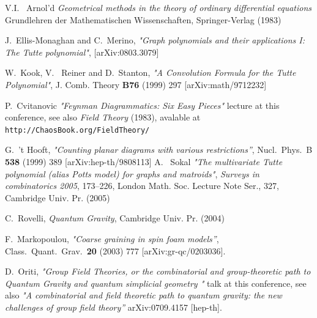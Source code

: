 \documentclass[12pt,here,feynmf]{article}
\begin{document}
\begin{thebibliography}{99}
V.I.~ Arnol'd {\it Geometrical methods in the theory of ordinary
  differential equations} Grundlehren der Mathematischen
Wissenschaften, Springer-Verlag  (1983)



J.~Ellis-Monaghan and C.~Merino,
{\it "Graph polynomials and their applications I: The Tutte polynomial"},
[arXiv:0803.3079]



W.~Kook, V.~ Reiner and D.~Stanton,
{\it "A Convolution Formula for the Tutte Polynomial"},
 J. Comb. Theory {\bf B76} (1999) 297
 [arXiv:math/9712232]



P.~Cvitanovic {\it"Feynman Diagrammatics: Six Easy Pieces"} lecture at this conference, see also
{\it Field Theory} (1983), avalable at {\tt http://ChaosBook.org/FieldTheory/}


  G.~'t Hooft,
  {\it "Counting planar diagrams with various restrictions''},
  Nucl.\ Phys.\  B {\bf 538} (1999) 389
  [arXiv:hep-th/9808113]
A.~ Sokal {\it "The multivariate Tutte polynomial (alias Potts model) for graphs and matroids"}, {\it Surveys in combinatorics 2005}, 173--226, London Math. Soc. Lecture Note Ser., 327, Cambridge Univ. Pr. (2005)


C.~Rovelli, {\it Quantum Gravity}, Cambridge Univ. Pr. (2004)

  
  F.~Markopoulou,
  {\it "Coarse graining in spin foam models''},
  Class.\ Quant.\ Grav.\  {\bf 20} (2003) 777
  [arXiv:gr-qc/0203036].

  D.~Oriti, {\it"Group Field Theories, or the combinatorial and group-theoretic path to Quantum Gravity
and quantum simplicial geometry
"} talk at this conference, see also
  {\it "A combinatorial and field theoretic path to quantum gravity: the new
  challenges of group field theory''}
  arXiv:0709.4157 [hep-th].
  



\end{thebibliography}
\end{document}
